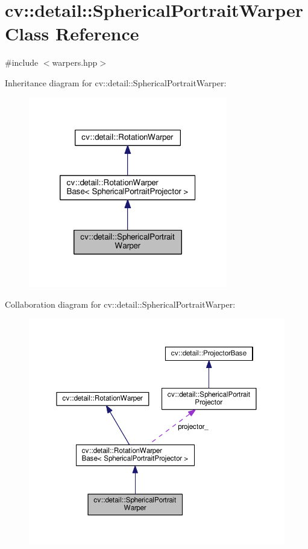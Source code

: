 \hypertarget{classcv_1_1detail_1_1SphericalPortraitWarper}{\section{cv\-:\-:detail\-:\-:Spherical\-Portrait\-Warper Class Reference}
\label{classcv_1_1detail_1_1SphericalPortraitWarper}
}


{\ttfamily \#include $<$warpers.\-hpp$>$}



Inheritance diagram for cv\-:\-:detail\-:\-:Spherical\-Portrait\-Warper\-:\nopagebreak
\begin{figure}[H]
\begin{center}
\leavevmode
\includegraphics[width=246pt]{classcv_1_1detail_1_1SphericalPortraitWarper__inherit__graph}
\end{center}
\end{figure}


Collaboration diagram for cv\-:\-:detail\-:\-:Spherical\-Portrait\-Warper\-:\nopagebreak
\begin{figure}[H]
\begin{center}
\leavevmode
\includegraphics[width=350pt]{classcv_1_1detail_1_1SphericalPortraitWarper__coll__graph}
\end{center}
\end{figure}
